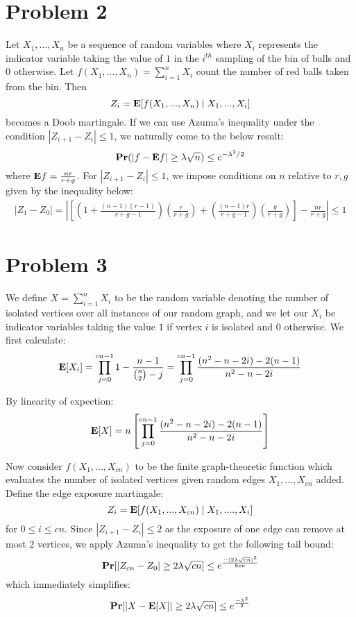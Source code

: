\documentclass[12pt]{article}%
\begin{document}
\section*{Problem 2}
Let $X_1,...,X_n$ be a sequence of random variables where $X_i$ represents the indicator variable taking the value of $1$ in the $i^{th}$ sampling of the bin of balls and $0$ otherwise. Let $f(X_1,...,X_n) = \sum_{i=1}^n X_i$ count the number of red balls taken from the bin. Then
$$ Z_i = {\bf E}[f(X_1,...,X_n)\mid X_1,...,X_i]$$ becomes a Doob martingale. If we can use Azuma's inequality under the condition $|Z_{i+1} - Z_{i}| \leq 1$, we naturally come to the below result:
$${\bf Pr}(|f - {\bf E}f| \geq \lambda\sqrt{n}) \leq e^{-\lambda^2/2} $$
where ${\bf E}f = \frac{nr}{r+g}$. \newline \newline
For $|Z_{i+1} - Z_{i}| \leq 1$, we impose conditions on $n$ relative to $r,g$ given by the inequality below:
\begin{gather*}
  |Z_1 - Z_0| = \left| \left[\left(1 + \frac{(n-1)(r-1)}{r+g-1} \right)\left(\frac{r}{r+g}\right) + \left(\frac{(n-1)r}{r+g-1} \right)\left(\frac{g}{r+g}\right)\right] - \frac{nr}{r+g} \right| \leq 1
\end{gather*}

\section*{Problem 3}

We define $X = \sum_{i = 1}^{n} X_i$ to be the random variable denoting the number of isolated vertices over all instances of our random graph, and we let our $X_i$ be indicator variables taking the value $1$ if vertex $i$ is isolated and $0$ otherwise. We first calculate:
$$ {\bf E}[X_i] = \prod_{j=0}^{cn-1} 1 - \frac{n-1}{{n\choose2} - j} = \prod_{j=0}^{cn -1} \frac{(n^2 -n - 2i)-2(n-1)}{n^2 - n - 2i}$$

By linearity of expection:
$${\bf E}[X] = n \left[\prod_{j=0}^{cn -1} \frac{(n^2 -n - 2i)-2(n-1)}{n^2 - n - 2i}\right]$$

Now consider $f(X_1,...,X_{cn})$ to be the finite graph-theoretic function which evaluates the number of isolated vertices given random edges $X_1,...,X
_{cn}$ added. Define the edge exposure martingale:
$$ Z_i = {\bf E}[f(X_1,...,X_{cn})\mid X_1,....,X_i] $$ for $0 \leq i \leq cn$. Since $|Z_{i+1} - Z_i| \leq 2$ as the exposure of one edge can remove at most $2$ vertices, we apply Azuma's inequality to get the following tail bound:
$${\bf Pr}[|Z_{cn} - Z_0| \geq 2\lambda\sqrt{cn}] \leq e^{\frac{-(2\lambda\sqrt{cn})^2}{8cn}} $$ which immediately simplifies:
$${\bf Pr}[|X - {\bf E}[X]| \geq 2\lambda\sqrt{cn}] \leq e^{\frac{-\lambda^2}{2}} $$
\end{document}
